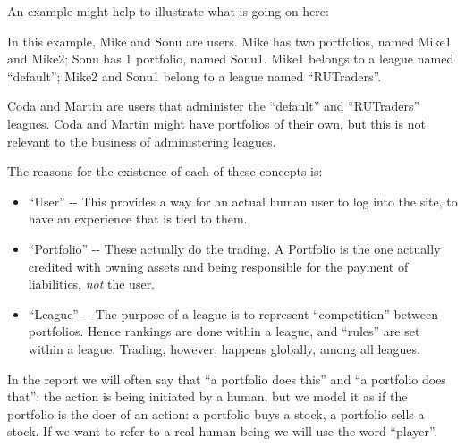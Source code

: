 \documentclass[a4]{article}
\begin{document}
An example might help to illustrate what is going on here:
\begin{figure}
\noindent{}
\end{figure}

In this example, Mike and Sonu are users. Mike has two portfolios, named Mike1
and Mike2; Sonu has 1 portfolio, named Sonu1. Mike1 belongs to a league named
``default''; Mike2 and Sonu1 belong to a league named ``RUTraders''.

Coda and Martin are users that administer the ``default'' and ``RUTraders''
leagues. Coda and Martin might have portfolios of their own, but this is not
relevant to the business of administering leagues.

The reasons for the existence of each of these concepts is:
%
\begin{itemize}

\item ``User'' -{}- This provides a way for an actual human user to log into the site,
to have an experience that is tied to them.

\item ``Portfolio'' -{}- These actually do the trading. A Portfolio is the one actually
credited with owning assets and being responsible for the payment of
liabilities, \emph{not} the user.

\item ``League'' -{}- The purpose of a league is to represent ``competition'' between
portfolios. Hence rankings are done within a league, and ``rules'' are set
within a league. Trading, however, happens globally, among all leagues.

\end{itemize}

In the report we will often say that ``a portfolio does this'' and ``a portfolio
does that''; the action is being initiated by a human, but we model it as if the
portfolio is the doer of an action: a portfolio buys a stock, a portfolio sells
a stock. If we want to refer to a real human being we will use the word
``player''.
\end{document}
